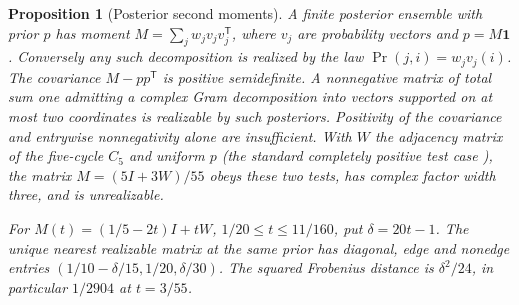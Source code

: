 \documentclass[aps,pra,onecolumn,superscriptaddress,nofootinbib,10pt]{revtex4-2}
\newtheorem{proposition}[theorem]{Proposition}
\theoremstyle{definition}
\theoremstyle{remark}
\begin{document}
\begin{proposition}[Posterior second moments]\label{ob:posteriormoments}
A finite posterior ensemble with prior $p$ has moment
$M=\sum_j w_j v_jv_j^{\mathsf T}$, where $v_j$ are probability
vectors and $p=M\mathbf1$. Conversely any such decomposition is
realized by the law $\Pr(j,i)=w_jv_j(i)$. The covariance
$M-pp^{\mathsf T}$ is positive semidefinite.
A nonnegative matrix of total sum one admitting a complex Gram
decomposition into vectors supported on at most two coordinates
is realizable by such posteriors. Positivity of the covariance and
entrywise nonnegativity alone are insufficient. With $W$ the adjacency
matrix of the five-cycle $C_5$ and uniform $p$ (the standard completely positive test case \cite{rf:Berman2003}), the matrix $M=(5I+3W)/55$
obeys these two tests, has complex factor width three, and is unrealizable.

For $M(t)=(1/5-2t)I+tW$, $1/20\le t\le11/160$, put
$\delta=20t-1$. The unique nearest realizable matrix at the same
prior has diagonal, edge and nonedge entries
$(1/10-\delta/15,1/20,\delta/30)$. The squared Frobenius
distance is $\delta^2/24$, in particular $1/2904$ at $t=3/55$.
\end{proposition}
\end{document}
